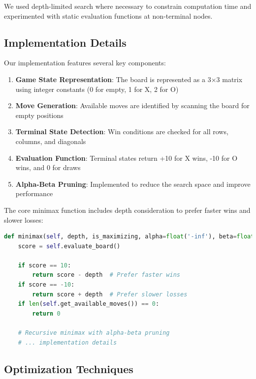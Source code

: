 \documentclass[12pt]{article}
\begin{document}
We used depth-limited search where necessary to constrain computation time and experimented with static evaluation functions at non-terminal nodes.

\subsection{Implementation Details}

Our implementation features several key components:

\begin{enumerate}
    \item \textbf{Game State Representation}: The board is represented as a 3×3 matrix using integer constants (0 for empty, 1 for X, 2 for O)
    
    \item \textbf{Move Generation}: Available moves are identified by scanning the board for empty positions
    
    \item \textbf{Terminal State Detection}: Win conditions are checked for all rows, columns, and diagonals
    
    \item \textbf{Evaluation Function}: Terminal states return +10 for X wins, -10 for O wins, and 0 for draws
    
    \item \textbf{Alpha-Beta Pruning}: Implemented to reduce the search space and improve performance
\end{enumerate}

The core minimax function includes depth consideration to prefer faster wins and slower losses:

\begin{lstlisting}[language=Python, basicstyle=\small]
def minimax(self, depth, is_maximizing, alpha=float('-inf'), beta=float('inf')):
    score = self.evaluate_board()
    
    if score == 10:
        return score - depth  # Prefer faster wins
    if score == -10:
        return score + depth  # Prefer slower losses
    if len(self.get_available_moves()) == 0:
        return 0
    
    # Recursive minimax with alpha-beta pruning
    # ... implementation details
\end{lstlisting}

\subsection{Optimization Techniques}
\end{document}
